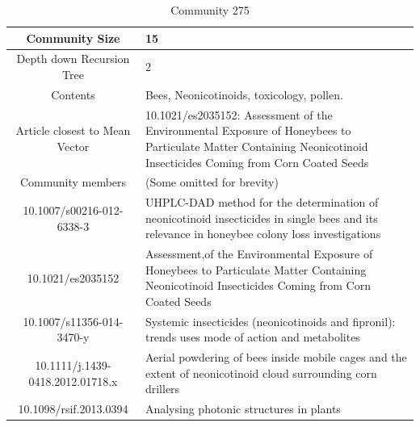 \begin{table}[H]
\centering
\caption{Community 275}
\label{tab:com275}
\begin{tabular}{||c|X||}
\hline
Community Size                   & 15                                                                                                                                                                 \\ \hline
Depth down Recursion Tree        & 2                                                                                                                                                                  \\ \hline
Contents                         & Bees, Neonicotinoids, toxicology, pollen.                                                                                                                          \\ \hline
Article closest to Mean Vector                      & 10.1021/es2035152: \footnotesize{Assessment of the Environmental Exposure of Honeybees to Particulate Matter Containing Neonicotinoid Insecticides Coming from Corn Coated Seeds} \\ \hline
Community members                & (Some omitted for brevity)                                                                                                                                         \\ \hline
10.1007/s00216-012-6338-3        & \footnotesize{UHPLC-DAD  method for the determination of neonicotinoid insecticides in single bees and its relevance in honeybee colony loss investigations }                    \\ \hline
10.1021/es2035152                & \footnotesize{Assessment,of the Environmental Exposure of Honeybees to Particulate Matter Containing Neonicotinoid Insecticides Coming from Corn Coated Seeds }                   \\ \hline
10.1007/s11356-014-3470-y        & \footnotesize{Systemic insecticides (neonicotinoids and fipronil): trends uses mode of action and metabolites                                                                   } \\ \hline
10.1111/j.1439-0418.2012.01718.x & \footnotesize{Aerial powdering of bees inside mobile cages and the extent of neonicotinoid cloud surrounding corn drillers}                                                       \\ \hline
10.1098/rsif.2013.0394           & \footnotesize{Analysing photonic structures in plants                                                } \\ \hline

\end{tabular}
\end{table}
